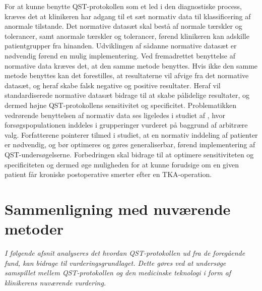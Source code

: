 For at kunne benytte QST-protokollen som et led i den diagnostiske process, kræves det at klinikeren har adgang til et sæt normativ data til klassificering af anormale tilstande. Det normative datasæt skal bestå af normale tærskler og tolerancer, samt anormale tærskler og tolerancer, førend klinikeren kan adskille patientgrupper fra hinanden. Udviklingen af sådanne normative datasæt er nødvendig førend en mulig implementering. Ved fremadrettet benyttelse af normative data kræves det, at den samme metode benyttes. Hvis ikke den samme metode benyttes kan det forestilles, at resultaterne vil afvige fra det normative datasæt, og heraf skabe falsk negative og positive resultater. Heraf vil standardiserede normative datasæt bidrage til at skabe pålidelige resultater, og dermed højne QST-protokollens sensitivitet og specificitet. \citep{Yarnitsky1997} Problematikken vedrørende benyttelsen af normativ data ses ligeledes i studiet af , hvor forsøgspopulationen inddeles i grupperinger vurderet på baggrund af arbitrære valg. Forfatterene pointerer tilmed i studiet, at en normativ inddeling af patienter er nødvendig, og bør optimeres og gøres generaliserbar, førend implementering af QST-undersøgelserne. \citep{Petersen2016} Forbedringen skal bidrage til at optimere sensitiviteten og specificiteten og dermed øge muligheden for at kunne forudsige om en given patient får kroniske postoperative smerter efter en TKA-operation. 

\section{Sammenligning med nuværende metoder}
\textit{I følgende afsnit analyseres det hvordan QST-protokollen ud fra de foregående fund, kan bidrage til vurderingsgrundlaget. Dette gøres ved at undersøge samspillet mellem QST-protokollen og den medicinske teknologi i form af klinikerens nuværende vurdering.}

